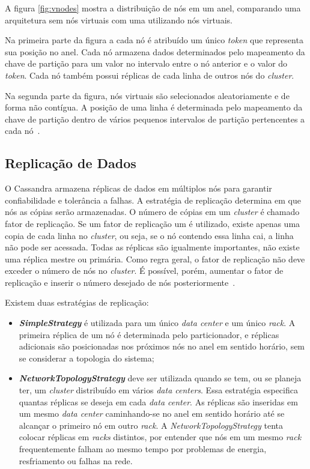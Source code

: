 A figura \ref{fig:vnodes} mostra a distribuição de nós em um anel, comparando uma arquitetura sem nós virtuais com uma utilizando nós virtuais. 

Na primeira parte da figura a cada nó é atribuído um único \emph{token} que representa sua posição no anel. Cada nó armazena dados determinados pelo mapeamento da chave de partição para um valor no intervalo entre o nó anterior e o valor do \emph{token}. Cada nó também possui réplicas de cada linha de outros nós do \emph{cluster}. 

Na segunda parte da figura, nós virtuais são selecionados aleatoriamente e de forma não contígua. A posição de uma linha é determinada pelo mapeamento da chave de partição dentro de vários pequenos intervalos de partição pertencentes a cada nó~\cite{cassandradocs}.


\subsection*{Replicação de Dados}
O Cassandra armazena réplicas de dados em múltiplos nós para garantir confiabilidade e tolerância a falhas. A estratégia de replicação determina em que nós as cópias serão armazenadas. O número de cópias em um \emph{cluster} é chamado fator de replicação. Se um fator de replicação um é utilizado, existe apenas uma copia de cada linha no \emph{cluster}, ou seja, se o nó contendo essa linha cai, a linha não pode ser acessada. Todas as réplicas são igualmente importantes, não existe uma réplica mestre ou primária. Como regra geral, o fator de replicação não deve exceder o número de nós no \emph{cluster}. É possível, porém, aumentar o fator de replicação e inserir o número desejado de nós posteriormente~\cite{cassandradocs}.

Existem duas estratégias de replicação:
\begin{itemize}
\item \textbf{\emph{SimpleStrategy}} é utilizada para um único \emph{data center} e um único \emph{rack}. A primeira réplica de um nó é determinada pelo particionador, e réplicas adicionais são posicionadas nos próximos nós no anel em sentido horário, sem se considerar a topologia do sistema;
 
\item \textbf{\emph{NetworkTopologyStrategy}} deve ser utilizada quando se tem, ou se planeja ter, um \emph{cluster} distribuído em vários \emph{data centers}. Essa estratégia especifica quantas réplicas se deseja em cada \emph{data center}. As réplicas são inseridas em um mesmo \emph{data center} caminhando-se no anel em sentido horário até se alcançar o primeiro nó em outro \emph{rack}. A \emph{NetworkTopologyStrategy} tenta colocar réplicas em \emph{racks} distintos, por entender que nós em um mesmo \emph{rack} frequentemente falham ao mesmo tempo por problemas de energia, resfriamento ou falhas na rede.
\end{itemize}

